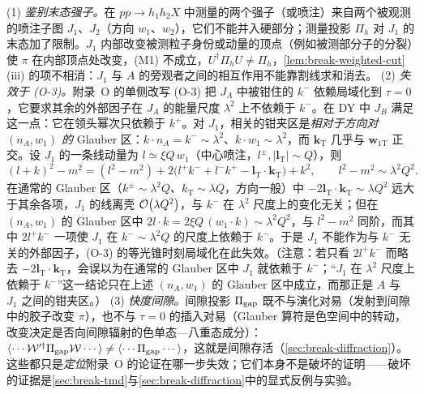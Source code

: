 \begin{remark}[失效的位置]\label{rem:break-measurement-failures}
(1) \emph{鉴别末态强子。}在 $pp\to h_1h_2X$ 中测量的两个强子（或喷注）来自两个被观测的喷注子图 $J_1$、$J_2$（方向 $w_1$、$w_2$），它们不能并入硬部分；测量投影 $\Pi_h$ 对 $J_1$ 的末态加了限制。$J_1$ 内部改变被测粒子身份或动量的顶点（例如被测部分子的分裂）使 $\pi$ 在内部顶点处改变，(M1) 不成立，$U^\dagger\Pi_hU\neq\Pi_h$，\cref{lem:break-weighted-cut}(iii) 的项不相消：$J_1$ 与 $A$ 的旁观者之间的相互作用不能靠割线求和消去。
(2) \emph{失效于 (O-3)。}附录~O 的单侧改写 (O-3) 把 $J_A$ 中被钳住的 $k^-$ 依赖局域化到 $\tau=0$，它要求其余的外部因子在 $J_A$ 的能量尺度 $\lambda^2$ 上不依赖于 $k^-$。在 DY 中 $J_B$ 满足这一点：它在领头幂次只依赖于 $k^+$。对 $J_1$，相关的钳夹区是\emph{相对于方向对 $(n_A,w_1)$ 的} Glauber 区：$k\cdot n_A=k^-\sim\lambda^2$、$k\cdot w_1\sim\lambda^2$，而 $\boldsymbol k_{\mathrm T}$ 几乎与 $\boldsymbol w_{1\mathrm T}$ 正交。设 $J_1$ 的一条线动量为 $l\simeq\xi Q\,w_1$（中心喷注，$l^\pm,|\boldsymbol l_{\mathrm T}|\sim Q$），则
\begin{equation}\label{eq:break-J1-denominator}
(l+k)^2-m^2=(l^2-m^2)+2\big(l^+k^-+l^-k^+-\boldsymbol l_{\mathrm T}\cdot\boldsymbol k_{\mathrm T}\big)+k^2 ,\qquad l^2-m^2\sim\lambda^2Q^2 .
\end{equation}
在通常的 Glauber 区（$k^\pm\sim\lambda^2Q$、$k_{\mathrm T}\sim\lambda Q$，方向一般）中 $-2\boldsymbol l_{\mathrm T}\cdot\boldsymbol k_{\mathrm T}\sim\lambda Q^2$ 远大于其余各项，$J_1$ 的线离壳 $\mathcal{O}\!\left(\lambda Q^2\right)$，与 $k^-$ 在 $\lambda^2$ 尺度上的变化无关；但在 $(n_A,w_1)$ 的 Glauber 区中 $2l\cdot k=2\xi Q\,(w_1\cdot k)\sim\lambda^2Q^2$，与 $l^2-m^2$ 同阶，而其中 $2l^+k^-$ 一项使 $J_1$ 在 $k^-\sim\lambda^2Q$ 的尺度上依赖于 $k^-$。于是 $J_1$ 不能作为与 $k^-$ 无关的外部因子，(O-3) 的等光锥时刻局域化在此失效。（注意：若只看 $2l^+k^-$ 而略去 $-2\boldsymbol l_{\mathrm T}\cdot\boldsymbol k_{\mathrm T}$，会误以为在通常的 Glauber 区中 $J_1$ 就依赖于 $k^-$；“$J_1$ 在 $\lambda^2$ 尺度上依赖于 $k^-$”这一结论只在上述 $(n_A,w_1)$ 的 Glauber 区中成立，而那正是 $A$ 与 $J_1$ 之间的钳夹区。）
(3) \emph{快度间隙。}间隙投影 $\Pi_{\rm gap}$ 既不与演化对易（发射到间隙中的胶子改变 $\pi$），也不与 $\tau=0$ 的插入对易（Glauber 算符是色空间中的转动，改变决定是否向间隙辐射的色单态—八重态成分）：$\langle\cdots\mathcal W'^\dagger\Pi_{\rm gap}\mathcal W\cdots\rangle\neq\langle\cdots\Pi_{\rm gap}\cdots\rangle$，这就是间隙存活（\cref{sec:break-diffraction}）。
这些都只是\emph{定位}附录~O 的论证在哪一步失效；它们本身不是破坏的证明——破坏的证据是\cref{sec:break-tmd}与\cref{sec:break-diffraction}中的显式反例与实验。
\end{remark}

